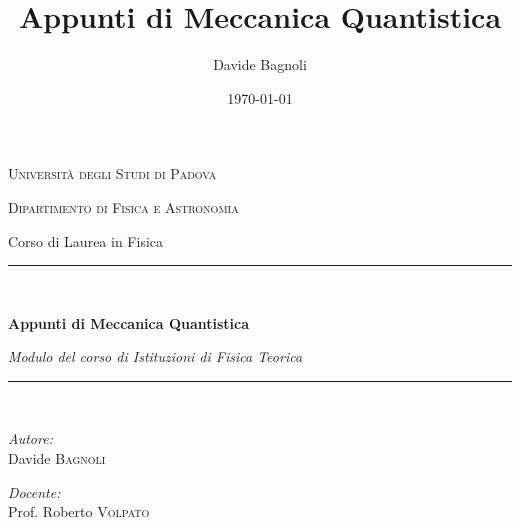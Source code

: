 \documentclass[12pt,a4paper,parskip=half,DIV=14,oneside,chapterprefix=true]{scrreprt}
\title{Appunti di Meccanica Quantistica}
\author{Davide Bagnoli}
\date{\today}
\begin{document}

\begin{titlepage}
    \centering
    {\scshape\LARGE Università degli Studi di Padova \par}
    \vspace{0.5cm}
    {\scshape\Large Dipartimento di Fisica e Astronomia \par}
    \vspace{0.5cm}
    {\large Corso di Laurea in Fisica \par}
    
    \vspace{1.5cm}
    

    \rule{\linewidth}{0.5mm} \\[0.4cm] %
    {\huge\bfseries Appunti di Meccanica Quantistica \par}
    \vspace{0.4cm}
    {\Large\itshape Modulo del corso di Istituzioni di Fisica Teorica \par}
    \rule{\linewidth}{0.5mm} \\[1.5cm] %
    
    \begin{minipage}[t]{0.4\textwidth}
        \begin{flushleft} \large
            \emph{Autore:}\\
            Davide \textsc{Bagnoli}
        \end{flushleft}
    \end{minipage}
    \hfill
    \begin{minipage}[t]{0.4\textwidth}
        \begin{flushright} \large
            \emph{Docente:}\\
            Prof. Roberto \textsc{Volpato}
        \end{flushright}
    \end{minipage}

    \vfill %


\end{titlepage}
\end{document}

